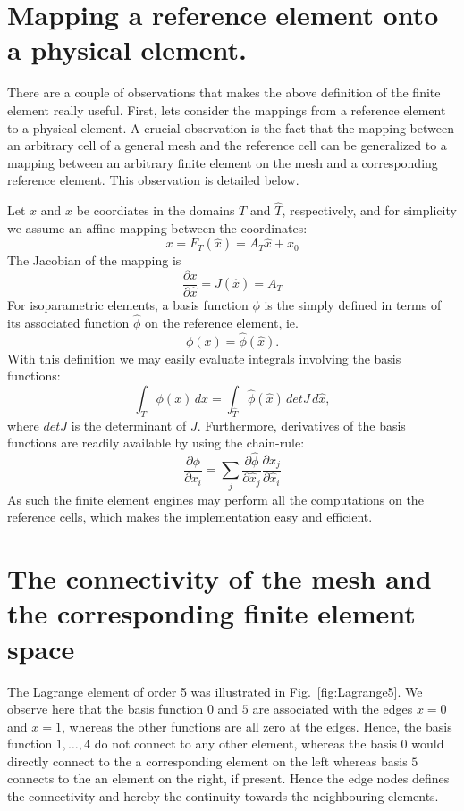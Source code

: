 \section{Mapping a reference element onto a physical element. }

There are a couple of observations that makes the above definition of the finite element really useful.
First, lets consider the mappings from a reference element to a physical element. A crucial observation
is the fact that 
the mapping between an arbitrary cell of a general mesh and the reference cell can be generalized to 
a mapping between an arbitrary finite element on the mesh and a corresponding reference element.  
This observation is detailed below. 

Let $x$ and $\hat{x}$ be coordiates in the domains $T$ and $\hat{T}$, respectively, and  
for simplicity we assume an affine mapping between the coordinates:  
\[
x = F_T(\hat{x}) = A_T \hat{x} + x_0   
\]
The Jacobian of the mapping is 
\[
\frac{\partial x}{\partial \hat{x}} = J(\hat{x}) = A_T      
\]
For isoparametric elements, a basis function $\phi$
is the simply defined in terms of its associated function $\hat{\phi}$
on the reference
element, ie. 
\[
\phi(x) = \hat{\phi}(\hat{x}) .  
\]
With this definition we may easily evaluate integrals involving the basis functions: 
\[
\int_T \phi(x) \, dx = \int_{\hat{T}} \hat{\phi}(\hat{x}) \, det J \, d\hat{x},  
\]
where $det J$ is the determinant of $J$.  Furthermore, derivatives of the basis functions are readily available by using the chain-rule:  
\[
\frac{\partial \phi}{\partial x_i } = \sum_j  \frac{\partial \hat{\phi}}{\partial \hat{x}_j } \frac{\partial \hat{x}_j}{\partial \hat{x}_i } 
\]
As such the finite element engines may perform all the computations on the reference cells, which makes the implementation easy and efficient. 

\section{The connectivity of the mesh and the corresponding finite element space}

The Lagrange element of order 5 was illustrated in Fig.~\ref{fig:Lagrange5}. We observe here that the basis function $0$ and $5$ are associated
with the edges $x=0$ and $x=1$, whereas the other functions are all zero at the edges. Hence, the basis function $1, \ldots, 4$ do not connect 
to any other element, whereas the basis $0$ would directly connect to the a corresponding element on the left whereas basis $5$ connects to the 
an element on the right, if present. Hence the edge nodes defines the connectivity and hereby the continuity towards the neighbouring elements. 



